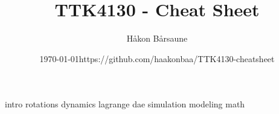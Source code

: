 \documentclass{article}
\title{TTK4130 - Cheat Sheet}
\author{Håkon Bårsaune}
\date{\centering\today\endgraf\bigskip https://github.com/haakonbaa/TTK4130-cheatsheet}
\begin{document}
\maketitle

\tableofcontents

\newpage

\begin{multicols}{2}
{intro} \newpage
{rotations}\newpage
{dynamics}\newpage
{lagrange} \newpage
{dae}\newpage
{simulation}\newpage
{modeling}\newpage
{math}
\end{multicols}
\end{document}
